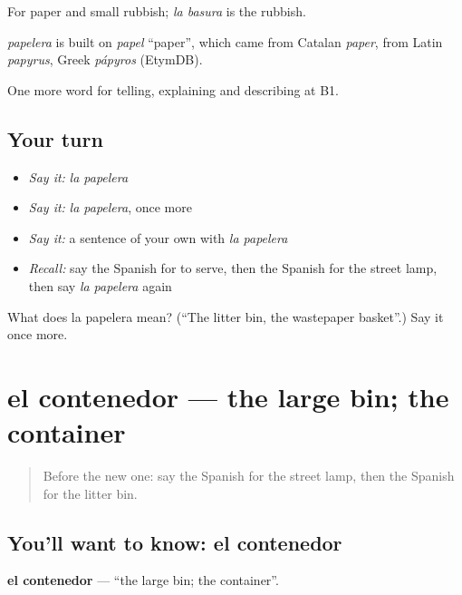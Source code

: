 For paper and small rubbish; \emph{la basura} is the rubbish.

\begin{cousinweb}
\emph{papelera} is built on \emph{papel} \textquotedblleft{}paper\textquotedblright{}, which came from Catalan \emph{paper}, from Latin \emph{papyrus}, Greek \emph{pápyros} (EtymDB).
\end{cousinweb}

\begin{grammarlens}[title={What you've built}]
One more word for telling, explaining and describing at B1.
\end{grammarlens}

\subsection*{Your turn}
\begin{itemize}
\raggedright
  \item \emph{Say it:} \emph{la papelera}
  \item \emph{Say it:} \emph{la papelera}, once more
  \item \emph{Say it:} a sentence of your own with \emph{la papelera}
  \item \emph{Recall:} say the Spanish for to serve, then the Spanish for the street lamp, then say \emph{la papelera} again
\end{itemize}

\begin{tcolorbox}[breakable,colback=teal!4,colframe=teal!35!black,title={Before you move on}]
What does la papelera mean? (\textquotedblleft{}The litter bin, the wastepaper basket\textquotedblright{}.) Say it once more.
\end{tcolorbox}
\section[el contenedor]{el contenedor — the large bin; the container}

\label{lesson:ES-C682-contenedor}



\begin{quote}
Before the new one: say the Spanish for the street lamp, then the Spanish for the litter bin.
\end{quote}

\subsection*{You'll want to know: el contenedor}
\textbf{el contenedor} — \textquotedblleft{}the large bin; the container\textquotedblright{}.

